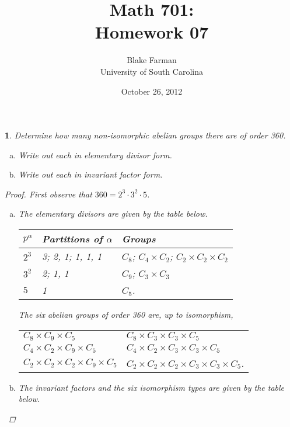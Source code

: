 \documentclass[10pt]{amsart}
\author{Blake Farman\\University of South Carolina}
\title{Math 701:\\Homework 07}
\date{October 26, 2012}
\begin{document}
\maketitle

\newtheorem{thm}{}
\newtheorem{lem}{Lemma}

\begin{thm}
  Determine how many non-isomorphic abelian groups there are of order 360.
  \begin{enumerate}[(a)]
  \item
    Write out each in elementary divisor form.
  \item
    Write out each in invariant factor form.
  \end{enumerate}
  
  \begin{proof}
	First observe that $360 = 2^3 \cdot 3^2 \cdot5$.
    \begin{enumerate}[(a)]
    \item
      The elementary divisors are given by the table below.\\
      \begin{center}
        \begin{tabular}{l| l | l}
          $p^\alpha$ & Partitions of $\alpha$ & Groups\\
          \hline
          $2^3$ & 3; 2, 1; 1, 1, 1 & $C_8$; $C_4 \times C_2$; $C_2 \times C_2 \times C_2$\\
          $3^2$ & 2; 1, 1 & $C_9$; $C_3 \times C_3$\\
          $5$ & 1 & $C_5$.
        \end{tabular}
      \end{center}
      The six abelian groups of order 360 are, up to isomorphism,\\
      \begin{center}
        \begin{tabular}{l l}
          $C_8 \times C_9 \times C_5$ & $C_8 \times C_3 \times C_3 \times C_5$\\
          $C_4 \times C_2 \times C_9 \times C_5$ & $C_4 \times C_2 \times C_3 \times C_3 \times C_5$\\
          $C_2 \times C_2 \times C_2 \times C_9 \times C_5$ & $C_2 \times C_2 \times C_2 \times C_3 \times C_3 \times C_5$.
        \end{tabular}
      \end{center}
    \item
      The invariant factors and the six isomorphism types are given by the table below.\\

\end{enumerate}
\end{proof}
\end{thm}
\end{document}
